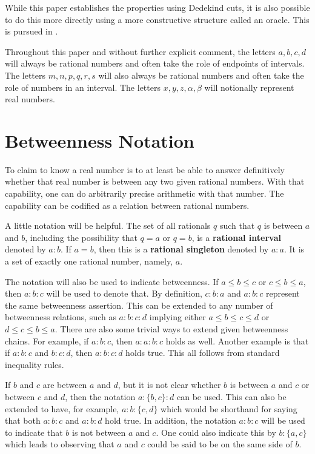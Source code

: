 \documentclass[12pt]{article}
\begin{document}
While this paper establishes the properties using Dedekind cuts, it is also possible to do this more directly using a more constructive structure called an oracle. This is pursued in \cite{taylor24oraclerbr}.

Throughout this paper and without further explicit comment, the letters $a, b, c, d$ will always be rational numbers and often take the role of endpoints of intervals. The letters $m, n, p, q, r, s$ will also always be rational numbers and often take the role of numbers in an interval. The letters $x, y, z, \alpha, \beta$ will notionally represent real numbers.

\section{Betweenness Notation}

To claim to know a real number is to at least be able to answer definitively whether that real number is between any two given rational numbers. With that capability, one can do arbitrarily precise arithmetic with that number. The capability can be codified as a relation between rational numbers. 

A little notation will be helpful. The set of all rationals $q$ such that $q$ is between $a$ and $b$, including the possibility that $q=a$ or $q=b$, is a \textbf{rational interval} denoted by $a:b$. If $a=b$, then this is a \textbf{rational singleton} denoted by $a:a$. It is a set of exactly one rational number, namely, $a$. 

The notation will also be used to indicate betweenness. If $a \leq b \leq c$ or $c \leq b \leq a$, then $a:b:c$ will be used to denote that. By definition, $c:b:a$ and $a:b:c$ represent the same betweenness assertion. This can be extended to any number of betweenness relations, such as $a:b:c:d$ implying either $a \leq b \leq c \leq d$ or $d \leq c \leq b \leq a$. There are also some trivial ways to extend given betweenness chains. For example, if $a:b:c$, then $a:a:b:c$ holds as well. Another example is that if $a:b:c$ and $b:c:d$, then $a:b:c:d$ holds true. This all follows from standard inequality rules. 

If $b$ and $c$ are between $a$ and $d$, but it is not clear whether $b$ is between $a$ and $c$ or between $c$ and $d$, then the notation $a:\{b,c\}:d$ can be used. This can also be extended to have, for example, $a:b:\{c,d\}$ which would be shorthand for saying that both $a:b:c$ and $a:b:d$ hold true. In addition, the notation \sout{$a:b:c$} will be used to indicate that $b$ is not between $a$ and $c$. One could also indicate this by $b:\{a,c\}$ which leads to observing that $a$ and $c$ could be said to be on the same side of $b$. 
\end{document}
